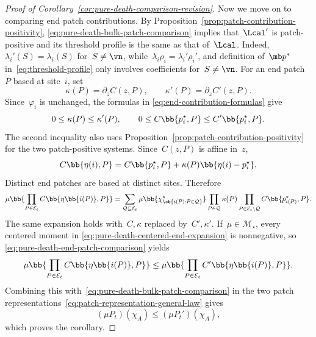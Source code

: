 \begin{proof}[Proof of Corollary~\ref{cor:pure-death-comparison-revision}]
Now we move on to comparing end patch contributions. By Proposition~\ref{prop:patch-contribution-positivity},
\eqref{eq:pure-death-bulk-patch-comparison} implies that~$\Lcal'$ is
patch-positive and its threshold profile is the same as that of~$\Lcal$. Indeed,~$\lambda_i'(S) = \lambda_i(S)$ for~$S\neq \vn$, while~$\lambda_i\rho_i=\lambda_i'\rho_i'$,
and definition of~$\mb p^*$ in~\eqref{eq:threshold-profile} only involves coefficients for~$S\neq \vn$. For an end patch~$P$ based at
site~$i$, set
\begin{equation*}
\kappa(P)=\partial_zC(z,P),
\qquad
\kappa'(P)=\partial_zC'(z,P).
\end{equation*}
Since~$\varphi_i$ is unchanged, the formulas in
\eqref{eq:end-contribution-formulas} give
\begin{equation}
\label{eq:pure-death-end-patch-comparison}
0\leq\kappa(P)\leq\kappa'(P),
\qquad
0\leq C\bb{p_i^\star,P}
\leq
C'\bb{p_i^\star,P}.
\end{equation}
The second inequality also uses Proposition~\ref{prop:patch-contribution-positivity}
for the two patch-positive systems. Since~$C(z,P)$ is affine in~$z$,
\begin{equation*}
C\bb{\eta(i),P}
=
C\bb{p_i^\star,P}
+
\kappa(P)\bb{\eta(i)-p_i^\star}.
\end{equation*}
Distinct end patches are based at distinct sites. Therefore
\begin{equation}
\mu\bb{
\prod_{P\in\mathcal E_t}
C\bb{\eta\bb{i(P)},P}
} =
\sum_{\mathcal Q\subseteq\mathcal E_t}
\mu\bb{
\chi_{\cb{i(P):P\in\mathcal Q}}^\star
}
\prod_{P\in\mathcal Q}\kappa(P)
\prod_{P\in\mathcal E_t\setminus\mathcal Q}
C\bb{p_{i(P)}^\star,P}.
\label{eq:pure-death-centered-end-expansion}
\end{equation}
The same expansion holds with~$C,\kappa$ replaced by~$C',\kappa'$. If~$\mu\in\mathcal M_\star$, every centered moment in
\eqref{eq:pure-death-centered-end-expansion} is nonnegative, so
\eqref{eq:pure-death-end-patch-comparison} yields
\begin{equation*}
\mu\bb{
\prod_{P\in\mathcal E_t}
C\bb{\eta\bb{i(P)},P}
}
\leq
\mu\bb{
\prod_{P\in\mathcal E_t}
C'\bb{\eta\bb{i(P)},P}
}.
\end{equation*}
Combining this with~\eqref{eq:pure-death-bulk-patch-comparison} in the two
patch representations~\eqref{eq:patch-representation-general-law} gives
\begin{equation*}
(\mu P_t)(\chi_A)
\leq
(\mu P_t')(\chi_A),
\end{equation*}
which proves the corollary.
\end{proof}

